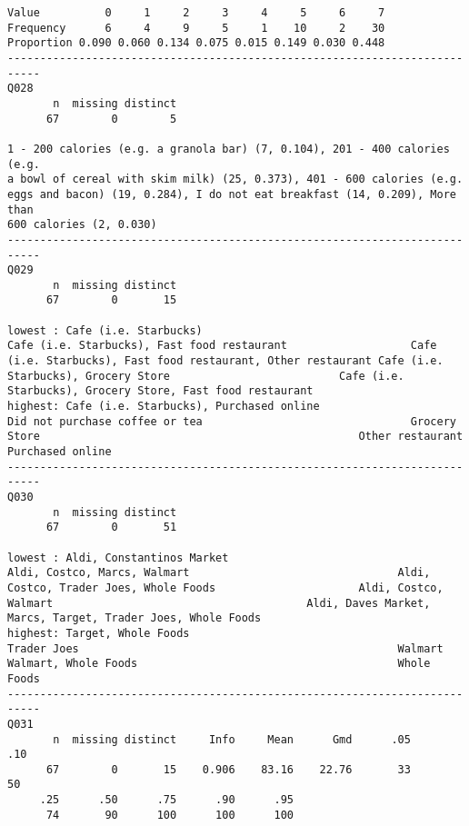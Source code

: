 \documentclass[]{article}
\begin{document}
\begin{verbatim}
Value          0     1     2     3     4     5     6     7
Frequency      6     4     9     5     1    10     2    30
Proportion 0.090 0.060 0.134 0.075 0.015 0.149 0.030 0.448
---------------------------------------------------------------------------
Q028 
       n  missing distinct 
      67        0        5 

1 - 200 calories (e.g. a granola bar) (7, 0.104), 201 - 400 calories (e.g.
a bowl of cereal with skim milk) (25, 0.373), 401 - 600 calories (e.g.
eggs and bacon) (19, 0.284), I do not eat breakfast (14, 0.209), More than
600 calories (2, 0.030)
---------------------------------------------------------------------------
Q029 
       n  missing distinct 
      67        0       15 

lowest : Cafe (i.e. Starbucks)                                         Cafe (i.e. Starbucks), Fast food restaurant                   Cafe (i.e. Starbucks), Fast food restaurant, Other restaurant Cafe (i.e. Starbucks), Grocery Store                          Cafe (i.e. Starbucks), Grocery Store, Fast food restaurant   
highest: Cafe (i.e. Starbucks), Purchased online                       Did not purchase coffee or tea                                Grocery Store                                                 Other restaurant                                              Purchased online                                             
---------------------------------------------------------------------------
Q030 
       n  missing distinct 
      67        0       51 

lowest : Aldi, Constantinos Market                                   Aldi, Costco, Marcs, Walmart                                Aldi, Costco, Trader Joes, Whole Foods                      Aldi, Costco, Walmart                                       Aldi, Daves Market, Marcs, Target, Trader Joes, Whole Foods
highest: Target, Whole Foods                                         Trader Joes                                                 Walmart                                                     Walmart, Whole Foods                                        Whole Foods                                                
---------------------------------------------------------------------------
Q031 
       n  missing distinct     Info     Mean      Gmd      .05      .10 
      67        0       15    0.906    83.16    22.76       33       50 
     .25      .50      .75      .90      .95 
      74       90      100      100      100 
                                                                      

\end{verbatim}
\end{document}
